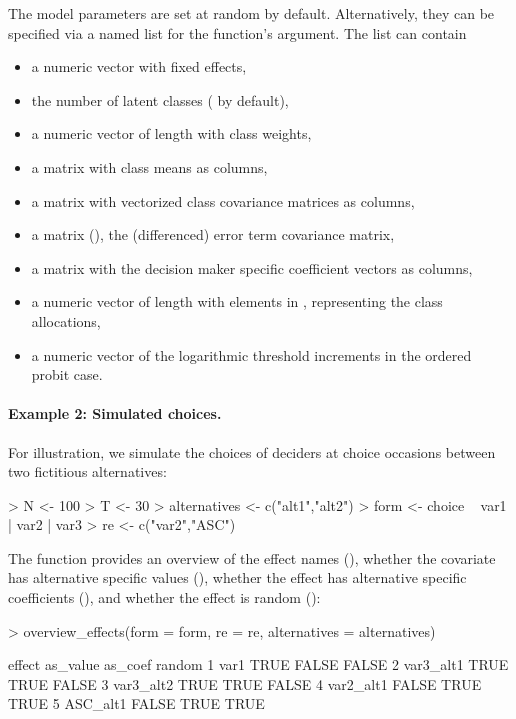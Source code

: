 \documentclass[article,shortnames]{jss}
\newcommand{\fct}[1]{\code{#1()}}
\begin{document}
The model parameters are set at random by default. Alternatively, they can be specified via a named list for the function's  argument. The list can contain
\begin{itemize}
  \item a numeric vector  with fixed effects,
  \item the number  of latent classes ( by default),
  \item a numeric vector  of length  with class weights,
  \item a matrix  with class means as columns,
  \item a matrix  with vectorized class covariance matrices as columns,
  \item a matrix  (), the (differenced) error term covariance matrix,
  \item a matrix  with the decision maker specific coefficient vectors as columns,
  \item a numeric vector  of length  with elements in , representing the class allocations,
  \item a numeric vector  of the logarithmic threshold increments in the ordered probit case.
\end{itemize}

\paragraph{Example 2: Simulated choices.}

For illustration, we simulate the choices of  deciders at  choice occasions between two fictitious alternatives:

\begin{Schunk}
\begin{Sinput}
> N <- 100
> T <- 30
> alternatives <- c("alt1","alt2")
> form <- choice ~ var1 | var2 | var3
> re <- c("var2","ASC")
\end{Sinput}
\end{Schunk}

The \fct{overview\_effects} function provides an overview of the effect names (), whether the covariate has alternative specific values (), whether the effect has alternative specific coefficients (), and whether the effect is random ():

\begin{Schunk}
\begin{Sinput}
> overview_effects(form = form, re = re, alternatives = alternatives)
\end{Sinput}
\begin{Soutput}
     effect as_value as_coef random
1      var1     TRUE   FALSE  FALSE
2 var3_alt1     TRUE    TRUE  FALSE
3 var3_alt2     TRUE    TRUE  FALSE
4 var2_alt1    FALSE    TRUE   TRUE
5  ASC_alt1    FALSE    TRUE   TRUE
\end{Soutput}
\end{Schunk}
\end{document}
